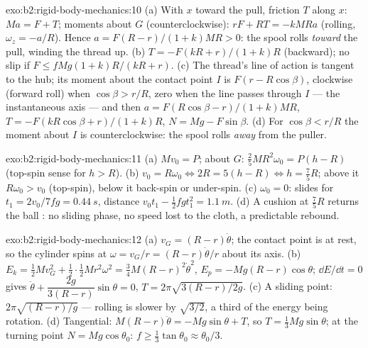 \begin{solution}{exo:b2:rigid-body-mechanics:10}
(a) With $x$ toward the pull, friction $T$ along $x$: $Ma = F + T$;
moments about $G$ (counterclockwise): $rF + RT = -kMRa$ (rolling, $\omega_z
= -a/R$). Hence $a = F(R - r)/(1 + k)MR > 0$: the spool rolls
\emph{toward} the pull, winding the thread up. (b) $T = -F(kR + r)/(1 +
k)R$ (backward); no slip if $F \le fMg(1 + k)R/(kR + r)$. (c) The thread's
line of action is tangent to the hub; its moment about the contact
point $I$ is $F(r - R\cos\beta)$, clockwise (forward roll) when $\cos\beta >
r/R$, zero when the line passes through $I$ --- the instantaneous axis
--- and then $a = F(R\cos\beta - r)/(1 + k)MR$, $T = -F(kR\cos\beta + r)/(1 + k)R$,
$N = Mg - F\sin\beta$. (d) For $\cos\beta < r/R$ the moment about $I$ is
counterclockwise: the spool rolls \emph{away} from the puller.
\end{solution}

\begin{solution}{exo:b2:rigid-body-mechanics:11}
(a) $Mv_0 = P$; about $G$: $\tfrac25MR^2\omega_0 = P(h - R)$ (top-spin sense
for $h > R$). (b) $v_0 = R\omega_0 \iff 2R = 5(h - R) \iff h = \tfrac75R$; above
it $R\omega_0 > v_0$ (top-spin), below it back-spin or under-spin. (c)
$\omega_0 = 0$: slides for $t_1 = 2v_0/7fg = \qty{0.44}{s}$, distance $v_0t_1 -
\tfrac12fgt_1^2 = \qty{1.1}{m}$. (d) A cushion at $\tfrac75R$ returns the ball
: no sliding phase, no speed lost to the cloth,
a predictable rebound.
\end{solution}

\begin{solution}{exo:b2:rigid-body-mechanics:12}
(a) $v_G = (R - r)\dot\theta$; the contact point is at rest, so the
cylinder spins at $\omega = v_G/r = (R - r)\dot\theta/r$ about its axis.
(b) $E_k = \tfrac12Mv_G^2 + \tfrac12\cdot\tfrac12Mr^2\omega^2 = \tfrac34M(R - r)^2
\dot\theta^2$, $E_p = -Mg(R - r)\cos\theta$; $\dd E/\dd t = 0$ gives $\ddot\theta
+ \dfrac{2g}{3(R - r)}\sin\theta = 0$, $T = 2\pi\sqrt{3(R - r)/2g}$. (c) A
sliding point: $2\pi\sqrt{(R - r)/g}$ --- rolling is slower by $\sqrt{3/2}$,
a third of the energy being rotation. (d) Tangential: $M(R - r)\ddot\theta =
-Mg\sin\theta + T$, so $T = \tfrac13Mg\sin\theta$; at the turning point
$N = Mg\cos\theta_0$: $f \ge \tfrac13\tan\theta_0 \approx \theta_0/3$.
\end{solution}

